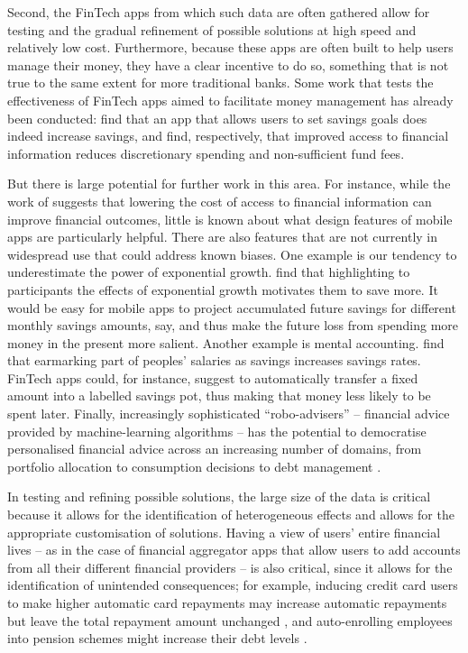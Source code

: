 Second, the FinTech apps from which such data are often gathered allow for
testing and the gradual refinement of possible solutions at high speed and
relatively low cost. Furthermore, because these apps are often built to help
users manage their money, they have a clear incentive to do so, something that
is not true to the same extent for more traditional banks. Some work that tests
the effectiveness of FinTech apps aimed to facilitate money management has
already been conducted: \citet{gargano2021goal} find that an app that allows
users to set savings goals does indeed increase savings, and
\citet{levi2020mind, carlin2022mobile} find, respectively, that improved access
to financial information reduces discretionary spending and non-sufficient fund
fees.

But there is large potential for further work in this area. For instance, while
the work of \citet{levi2020mind} suggests that lowering the cost of access to
financial information can improve financial outcomes, little is known about
what design features of mobile apps are particularly helpful. There are also
features that are not currently in widespread use that could address known
biases. One example is our tendency to underestimate the power of exponential
growth. \citet{mckenzie2011misunderstanding} find that highlighting to
participants the effects of exponential growth motivates them to save more. It
would be easy for mobile apps to project accumulated future savings for
different monthly savings amounts, say, and thus make the future loss from
spending more money in the present more salient. Another example is mental
accounting. \citet{soman2011earmarking} find that earmarking part of peoples'
salaries as savings increases savings rates. FinTech apps could, for instance,
suggest to automatically transfer a fixed amount into a labelled savings pot, thus
making that money less likely to be spent later. Finally, increasingly
sophisticated ``robo-advisers'' -- financial advice provided by
machine-learning algorithms -- has the potential to democratise personalised
financial advice across an increasing number of domains, from portfolio
allocation to consumption decisions to debt management
\citep{philippon2019fintech, dacunto2021new}.

In testing and refining possible solutions, the large size of the data is
critical because it allows for the identification of heterogeneous effects and
allows for the appropriate customisation of solutions. Having a view of users'
entire financial lives -- as in the case of financial aggregator apps that
allow users to add accounts from all their different financial providers -- is
also critical, since it allows for the identification of unintended
consequences; for example, inducing credit card users to make higher automatic
card repayments may increase automatic repayments but leave the total repayment
amount unchanged \citep{guttman2021semblance}, and auto-enrolling employees
into pension schemes might increase their debt levels
\citep{beshears2022borrowing}.

